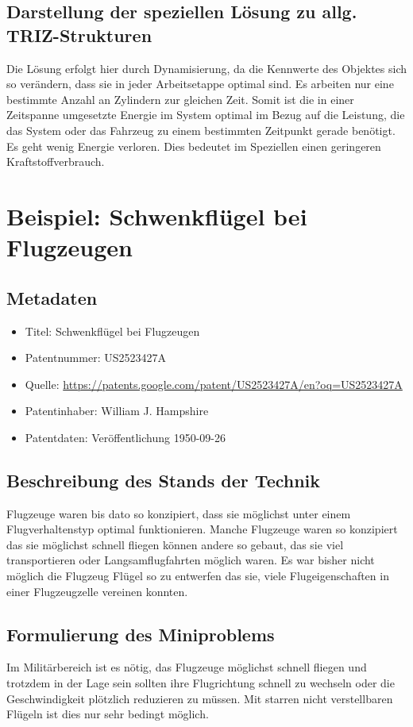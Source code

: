 \documentclass[11pt,a4paper]{article}
\begin{document}
\subsection{Darstellung der speziellen Lösung zu allg. TRIZ-Strukturen}
 
Die Lösung erfolgt hier durch Dynamisierung, da die Kennwerte des Objektes
sich so verändern, dass sie in jeder Arbeitsetappe optimal sind. Es arbeiten
nur eine bestimmte Anzahl an Zylindern zur gleichen Zeit. Somit ist die in
einer Zeitspanne umgesetzte Energie im System optimal im Bezug auf die
Leistung, die das System oder das Fahrzeug zu einem bestimmten Zeitpunkt
gerade benötigt. Es geht wenig Energie verloren. Dies bedeutet im Speziellen
einen geringeren Kraftstoffverbrauch.

\section{Beispiel: Schwenkflügel bei Flugzeugen}
\subsection{Metadaten}
\begin{itemize}\itemsep0pt
\item Titel: Schwenkflügel bei Flugzeugen
\item Patentnummer: US2523427A
\item Quelle: \url{https://patents.google.com/patent/US2523427A/en?oq=US2523427A}
\item Patentinhaber:  William J. Hampshire
\item Patentdaten: Veröffentlichung 1950-09-26
\end{itemize}

\subsection{Beschreibung des Stands der Technik}
Flugzeuge waren bis dato so konzipiert, dass sie möglichst unter einem
Flugverhaltenstyp optimal funktionieren. Manche Flugzeuge waren so konzipiert
das sie möglichst schnell fliegen können andere so gebaut, das sie viel
transportieren oder Langsamflugfahrten möglich waren. Es war bisher nicht
möglich die Flugzeug Flügel so zu entwerfen das sie, viele Flugeigenschaften
in einer Flugzeugzelle vereinen konnten.
\subsection{Formulierung des Miniproblems}
Im Militärbereich ist es nötig, das Flugzeuge möglichst schnell fliegen und
trotzdem in der Lage sein sollten ihre Flugrichtung schnell zu wechseln oder
die Geschwindigkeit plötzlich reduzieren zu müssen. Mit starren nicht
verstellbaren Flügeln ist dies nur sehr bedingt möglich.
\end{document}
